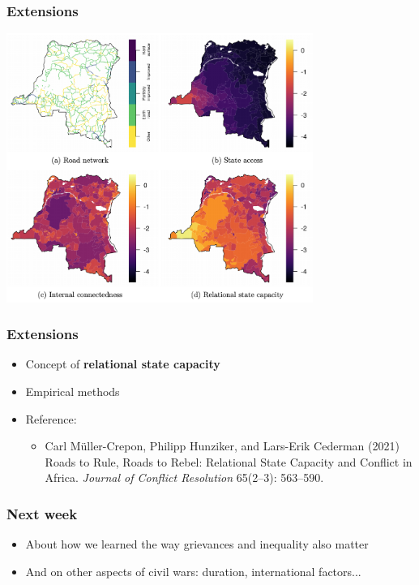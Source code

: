 \documentclass[aspectratio=43]{beamer}
\begin{document}
\begin{frame}
\frametitle{Extensions}
\centering

\includegraphics[width = 0.75\textwidth]{img/muller-crepon}

\end{frame}

\begin{frame}
\frametitle{Extensions}
\centering

\begin{itemize}
  \item Concept of \textbf{relational state capacity}
  \item Empirical methods
  \item Reference:
  \begin{itemize}
    \item {\small Carl Müller-Crepon, Philipp Hunziker, and Lars-Erik Cederman (2021) Roads to Rule, Roads to Rebel: Relational State Capacity and Conflict in Africa. \textit{Journal of Conflict Resolution} 65(2--3): 563--590.}
  \end{itemize}
\end{itemize}

\end{frame}

\begin{frame}
\frametitle{Next week}
\centering

\begin{itemize}
  \item About how we learned the way grievances and inequality also matter
  \item And on other aspects of civil wars: duration, international factors...
\end{itemize}

\end{frame}
\end{document}
